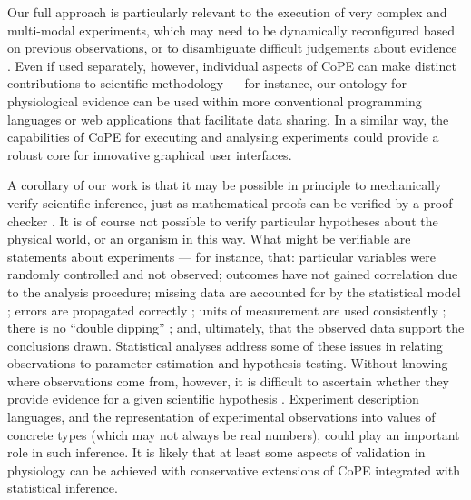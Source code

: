 Our full approach is particularly relevant to the execution of very
complex and multi-modal experiments, which may need to be dynamically
reconfigured based on previous observations, or to disambiguate
difficult judgements about evidence \cite{Kriegeskorte2009}. Even
if used separately, however, individual aspects of CoPE can make
distinct contributions to scientific methodology — for instance, our
ontology for physiological evidence can be used within more
conventional programming languages or web applications that facilitate
data sharing. In a similar way, the capabilities of CoPE for executing
and analysing experiments could provide a robust core for innovative
graphical user interfaces.

A corollary of our work is that it may be possible in principle to
mechanically verify scientific inference, just as mathematical proofs
can be verified by a proof checker \cite{DeBruijn1968,
  Harrison2009}. It is of course not possible to verify particular
hypotheses about the physical world, or an organism in this way. What
might be verifiable are statements about experiments --- for instance,
that: particular variables were randomly controlled and not observed;
outcomes have not gained correlation due to the analysis procedure;
missing data are accounted for by the statistical model
\cite{Gelman2003}; errors are propagated correctly \cite{Taylor1997};
units of measurement are used consistently \cite{Kennedy1997}; there
is no ``double dipping'' \cite{Kriegeskorte2009}; and, ultimately,
that the observed data support the conclusions drawn. Statistical
analyses address some of these issues in relating observations to
parameter estimation and hypothesis testing. Without knowing
where observations come from, however, it is difficult to ascertain whether
they provide evidence for a given scientific hypothesis
\cite{Pool2002}. Experiment description languages, and the
representation of experimental observations into values of concrete
types (which may not always be real numbers), could play an important
role in such inference. It is likely that at least some aspects of
validation in physiology can be achieved with conservative extensions
of
CoPE integrated with statistical inference.

